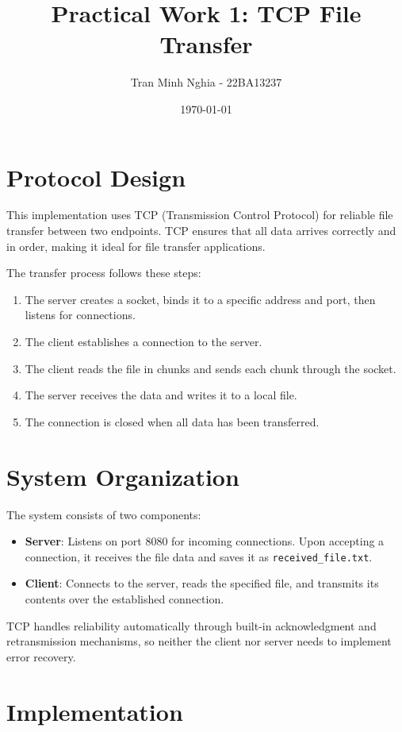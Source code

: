 \documentclass{article}
\title{Practical Work 1: TCP File Transfer}
\author{Tran Minh Nghia - 22BA13237}
\date{\today}
\begin{document}
\maketitle

\section{Protocol Design}
This implementation uses TCP (Transmission Control Protocol) for reliable file transfer between two endpoints. TCP ensures that all data arrives correctly and in order, making it ideal for file transfer applications.

The transfer process follows these steps:
\begin{enumerate}
    \item The server creates a socket, binds it to a specific address and port, then listens for connections.
    \item The client establishes a connection to the server.
    \item The client reads the file in chunks and sends each chunk through the socket.
    \item The server receives the data and writes it to a local file.
    \item The connection is closed when all data has been transferred.
\end{enumerate}

\section{System Organization}
The system consists of two components:
\begin{itemize}
    \item \textbf{Server}: Listens on port 8080 for incoming connections. Upon accepting a connection, it receives the file data and saves it as \texttt{received\_file.txt}.
    \item \textbf{Client}: Connects to the server, reads the specified file, and transmits its contents over the established connection.
\end{itemize}

TCP handles reliability automatically through built-in acknowledgment and retransmission mechanisms, so neither the client nor server needs to implement error recovery.

\section{Implementation}
\end{document}
